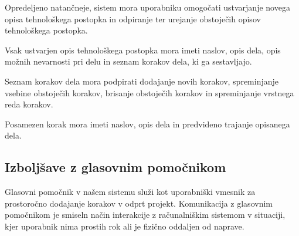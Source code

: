 \documentclass[a4paper, 12pt]{book}
\begin{document}
Opredeljeno natančneje, sistem mora uporabniku omogočati ustvarjanje novega opisa tehnološkega postopka in odpiranje ter urejanje obstoječih opisov tehnološkega postopka.
 
Vsak ustvarjen opis tehnološkega postopka mora imeti naslov, opis dela, opis možnih nevarnosti pri delu in seznam korakov dela, ki ga sestavljajo.
 
Seznam korakov dela mora podpirati dodajanje novih korakov, spreminjanje vsebine obstoječih korakov, brisanje obstoječih korakov in spreminjanje vrstnega reda korakov.
 
Posamezen korak mora imeti naslov, opis dela in predvideno trajanje opisanega dela.



% 
% 


\subsection{Izboljšave z glasovnim pomočnikom}

Glasovni pomočnik v našem sistemu služi kot uporabniški vmesnik za prostoročno dodajanje korakov v odprt projekt.
Komunikacija z glasovnim pomočnikom je smiseln način interakcije z računalniškim sistemom v situaciji, kjer uporabnik nima prostih rok ali je fizično oddaljen od naprave.
\end{document}
